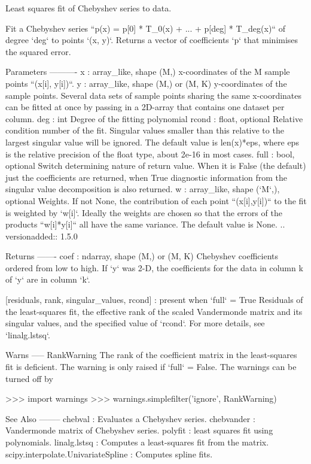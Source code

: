 \begin{DoxyVerb}Least squares fit of Chebyshev series to data.

Fit a Chebyshev series ``p(x) = p[0] * T_{0}(x) + ... + p[deg] *
T_{deg}(x)`` of degree `deg` to points `(x, y)`. Returns a vector of
coefficients `p` that minimises the squared error.

Parameters
----------
x : array_like, shape (M,)
    x-coordinates of the M sample points ``(x[i], y[i])``.
y : array_like, shape (M,) or (M, K)
    y-coordinates of the sample points. Several data sets of sample
    points sharing the same x-coordinates can be fitted at once by
    passing in a 2D-array that contains one dataset per column.
deg : int
    Degree of the fitting polynomial
rcond : float, optional
    Relative condition number of the fit. Singular values smaller than
    this relative to the largest singular value will be ignored. The
    default value is len(x)*eps, where eps is the relative precision of
    the float type, about 2e-16 in most cases.
full : bool, optional
    Switch determining nature of return value. When it is False (the
    default) just the coefficients are returned, when True diagnostic
    information from the singular value decomposition is also returned.
w : array_like, shape (`M`,), optional
    Weights. If not None, the contribution of each point
    ``(x[i],y[i])`` to the fit is weighted by `w[i]`. Ideally the
    weights are chosen so that the errors of the products ``w[i]*y[i]``
    all have the same variance.  The default value is None.
    .. versionadded:: 1.5.0

Returns
-------
coef : ndarray, shape (M,) or (M, K)
    Chebyshev coefficients ordered from low to high. If `y` was 2-D,
    the coefficients for the data in column k  of `y` are in column
    `k`.

[residuals, rank, singular_values, rcond] : present when `full` = True
    Residuals of the least-squares fit, the effective rank of the
    scaled Vandermonde matrix and its singular values, and the
    specified value of `rcond`. For more details, see `linalg.lstsq`.

Warns
-----
RankWarning
    The rank of the coefficient matrix in the least-squares fit is
    deficient. The warning is only raised if `full` = False.  The
    warnings can be turned off by

    >>> import warnings
    >>> warnings.simplefilter('ignore', RankWarning)

See Also
--------
chebval : Evaluates a Chebyshev series.
chebvander : Vandermonde matrix of Chebyshev series.
polyfit : least squares fit using polynomials.
linalg.lstsq : Computes a least-squares fit from the matrix.
scipy.interpolate.UnivariateSpline : Computes spline fits.


\end{DoxyVerb}
